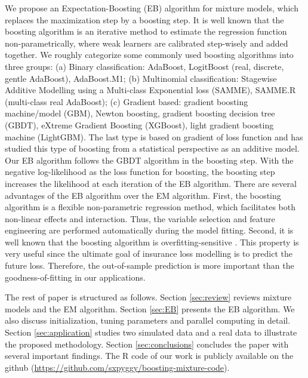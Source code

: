 \documentclass[11pt]{article}
\numberwithin{equation}{section}
\begin{document}
We propose an Expectation-Boosting (EB) algorithm for mixture models, which replaces the maximization step by a boosting step. 
It is well known that the boosting algorithm is an iterative method to estimate the regression function non-parametrically, where weak learners are calibrated step-wisely and added together.
We roughly categorize some commonly used boosting algorithms into three groups: 
(a) Binary classification: {AdaBoost}, LogitBoost (real, discrete, gentle AdaBoost), AdaBoost.M1; 
(b) Multinomial classification: Stagewise Additive Modelling using a Multi-class Exponential loss (SAMME), SAMME.R (multi-class real AdaBoost); 
(c) {Gradient based}: {gradient boosting machine/model (GBM)}, Newton boosting, gradient boosting decision tree (GBDT), {eXtreme Gradient Boosting (XGBoost)}, {light gradient boosting machine (LightGBM)}.
The last type is based on {gradient of loss function} and \citet{friedman2001greedy} has studied this type of boosting from a statistical perspective as an additive model.
Our EB algorithm follows the GBDT algorithm in the boosting step.
With the negative log-likelihood as the loss function for boosting, the boosting step increases the likelihood at each iteration of the EB algorithm. 
There are several advantages of the EB algorithm over the EM algorithm. 
First, the boosting algorithm is a flexible non-parametric regression method, which facilitates both non-linear effects and interaction. Thus, the variable selection and feature engineering are performed automatically during the model fitting. 
Second, it is well known that the boosting algorithm is overfitting-sensitive \citep{buehlmann:2003}. This property is very useful since the ultimate goal of insurance loss modelling is to predict the future loss. Therefore,
the out-of-sample prediction is more important than the goodness-of-fitting in our applications. 


The rest of paper is structured as follows. 
Section \ref{sec:review} reviews mixture models and the EM algorithm. 
Section \ref{sec:EB} presents the EB algorithm. We also discuss initialization, tuning parameters and parallel computing in detail.   
Section \ref{sec:application} studies two simulated data and a real data to illustrate the proposed methodology. Section \ref{sec:conclusions} concludes the paper with several important findings.  The R code of our work is publicly available on the github (\url{https://github.com/sxpyggy/boosting-mixture-code}).
\end{document}
